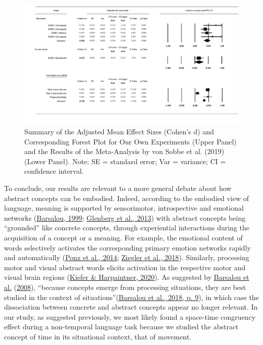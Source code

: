 \documentclass[
  a4paper,12pt,twoside,onecolumn,openright,final,oldfontcommands]{memoir}
\begin{document}
\begin{landscape}

\begin{figure}[htbp!]

{\centering \includegraphics[width=1\linewidth]{figures/chap-3-fig6} 

}

\caption{Summary of the Adjusted Mean Effect Sizes (Cohen’s d) and Corresponding Forest Plot for Our Own Experiments (Upper Panel) and the Results of the Meta-Analysis by von Sobbe et al. (2019) (Lower Panel). Note: SE = standard error; Var = variance; CI = confidence interval.}\label{fig:chap-3-fig6}
\end{figure}

\end{landscape}

To conclude, our results are relevant to a more general debate about how abstract concepts can be embodied. Indeed, according to the embodied view of language, meaning is supported by sensorimotor, introspective and emotional networks (\protect\hyperlink{ref-barsalou_perceptual_1999}{Barsalou, 1999}; \protect\hyperlink{ref-glenberg_revolution_2013}{Glenberg et al., 2013}) with abstract concepts being ``grounded'' like concrete concepts, through experiential interactions during the acquisition of a concept or a meaning. For example, the emotional content of words selectively activates the corresponding primary emotion networks rapidly and automatically (\protect\hyperlink{ref-ponz_emotion_2014}{Ponz et al., 2014}; \protect\hyperlink{ref-ziegler_words_2018}{Ziegler et al., 2018}). Similarly, processing motor and visual abstract words elicits activation in the respective motor and visual brain regions (\protect\hyperlink{ref-kiefer_varieties_2020}{Kiefer \& Harpaintner, 2020}). As suggested by \protect\hyperlink{ref-barsalou_language_2008}{Barsalou et al.} (\protect\hyperlink{ref-barsalou_language_2008}{2008}), ``because concepts emerge from processing situations, they are best studied in the context of situations''(\protect\hyperlink{ref-barsalou_moving_2018}{Barsalou et al., 2018, p. 9}), in which case the dissociation between concrete and abstract concepts appear no longer relevant. In our study, as suggested previously, we most likely found a space-time congruency effect during a non-temporal language task because we studied the abstract concept of time in its situational context, that of movement.
\end{document}
